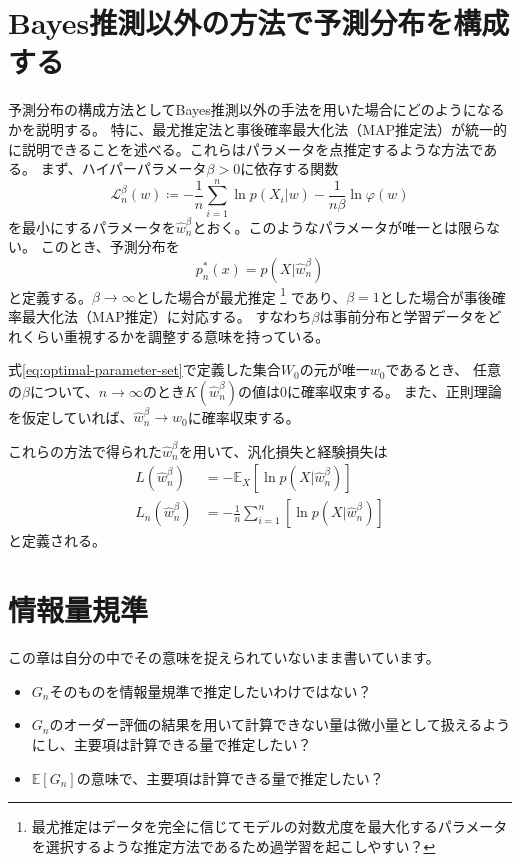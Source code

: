 \documentclass[dvipdfmx]{jsarticle}
\begin{document}
\newpage

\section{Bayes推測以外の方法で予測分布を構成する}
予測分布の構成方法としてBayes推測以外の手法を用いた場合にどのようになるかを説明する。
特に、最尤推定法と事後確率最大化法（MAP推定法）が統一的に説明できることを述べる。これらはパラメータを点推定するような方法である。
まず、ハイパーパラメータ$\beta>0$に依存する関数
\begin{equation}
    \mathcal{L}_n^{\beta}(w) \coloneqq -\frac{1}{n}\sum_{i=1}^{n}\ln{p(X_i|w)} - \frac{1}{n\beta}\ln{\varphi(w)}
\end{equation}
を最小にするパラメータを$\hat{w}^{\beta}_{n}$とおく。このようなパラメータが唯一とは限らない。
このとき、予測分布を
\begin{equation}
    p_n^{*}(x) = p(X|\hat{w}^{\beta}_{n})
\end{equation}
と定義する。$\beta\to\infty$とした場合が最尤推定
\footnote{
    最尤推定はデータを完全に信じてモデルの対数尤度を最大化するパラメータを選択するような推定方法であるため過学習を起こしやすい？
}
であり、$\beta=1$とした場合が事後確率最大化法（MAP推定）に対応する。
すなわち$\beta$は事前分布と学習データをどれくらい重視するかを調整する意味を持っている。


\begin{mybox}[推定量の一致性]
    式\eqref{eq:optimal-parameter-set}で定義した集合$W_0$の元が唯一$w_0$であるとき、
    任意の$\beta$について、$n\to\infty$のとき$K(\hat{w}_n^{\beta})$の値は$0$に確率収束する。
    また、正則理論を仮定していれば、$\hat{w}_n^{\beta}\to w_0$に確率収束する。
\end{mybox}

これらの方法で得られた$\hat{w}_n^{\beta}$を用いて、汎化損失と経験損失は
\begin{align}
    L(\hat{w}_n^{\beta}) &= -\mathbb{E}_X[\ln{p(X|\hat{w}_n^{\beta})}] \\
    L_n(\hat{w}_n^{\beta}) &= -\frac{1}{n}\sum_{i=1}^{n}[\ln{p(X|\hat{w}_n^{\beta})}]
\end{align}
と定義される。



\newpage

\section{情報量規準}
この章は自分の中でその意味を捉えられていないまま書いています。
\begin{itemize}
    \item $G_n$そのものを情報量規準で推定したいわけではない？
    \item $G_n$のオーダー評価の結果を用いて計算できない量は微小量として扱えるようにし、主要項は計算できる量で推定したい？
    \item $\mathbb{E}[G_n]$の意味で、主要項は計算できる量で推定したい？
\end{itemize}
\end{document}

